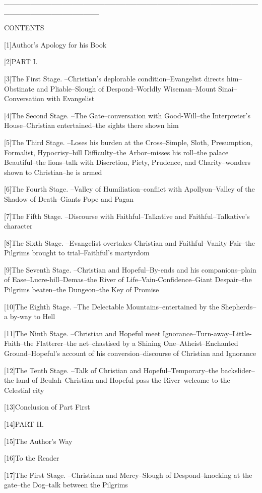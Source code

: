 __________________________________________________________________

CONTENTS

[1]Author's Apology for his Book

[2]PART I.

[3]The First Stage. --Christian's deplorable condition--Evangelist
directs him--Obstinate and Pliable--Slough of Despond--Worldly
Wiseman--Mount Sinai--Conversation with Evangelist

[4]The Second Stage. --The Gate--conversation with Good-Will--the
Interpreter's House--Christian entertained--the sights there shown him

[5]The Third Stage. --Loses his burden at the Cross--Simple, Sloth,
Presumption, Formalist, Hypocrisy--hill Difficulty--the Arbor--misses
his roll--the palace Beautiful--the lions--talk with Discretion, Piety,
Prudence, and Charity--wonders shown to Christian--he is armed

[6]The Fourth Stage. --Valley of Humiliation--conflict with
Apollyon--Valley of the Shadow of Death--Giants Pope and Pagan

[7]The Fifth Stage. --Discourse with Faithful--Talkative and
Faithful--Talkative's character

[8]The Sixth Stage. --Evangelist overtakes Christian and
Faithful--Vanity Fair--the Pilgrims brought to trial--Faithful's
martyrdom

[9]The Seventh Stage. --Christian and Hopeful--By-ends and his
companions--plain of Ease--Lucre-hill--Demas--the River of
Life--Vain-Confidence--Giant Despair--the Pilgrims beaten--the
Dungeon--the Key of Promise

[10]The Eighth Stage. --The Delectable Mountains--entertained by the
Shepherds--a by-way to Hell

[11]The Ninth Stage. --Christian and Hopeful meet
Ignorance--Turn-away--Little-Faith--the Flatterer--the net--chastised
by a Shining One--Atheist--Enchanted Ground--Hopeful's account of his
conversion--discourse of Christian and Ignorance

[12]The Tenth Stage. --Talk of Christian and Hopeful--Temporary--the
backslider--the land of Beulah--Christian and Hopeful pass the
River--welcome to the Celestial city

[13]Conclusion of Part First

[14]PART II.

[15]The Author's Way

[16]To the Reader

[17]The First Stage. --Christiana and Mercy--Slough of
Despond--knocking at the gate--the Dog--talk between the Pilgrims


